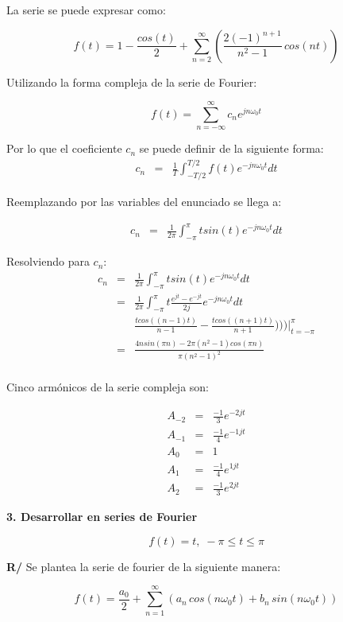 \documentclass[twocolumn]{article}
\begin{document}
La serie se puede expresar como:

$$f(t) = 1 - \frac{cos(t)}{2} + \sum_{n=2}^\infty\left( \frac{2(-1)^{n+1}}{n^2 - 1} \,cos(n t) \right)$$

Utilizando la forma compleja de la serie de Fourier:


$$f(t) =  \sum_{n=-\infty}^\infty c_n e^{jn\omega_0t} $$


Por lo que el coeficiente $c_n$ se puede definir de la siguiente forma:
\begin{eqnarray*}
c_n &=& \frac{1}{T}\int_{-T/2}^{T/2}f(t)e^{-jn\omega_0t}dt
\end{eqnarray*}

Reemplazando por las variables del enunciado se llega a:

\begin{eqnarray*}
c_n &=& \frac{1}{2\pi}\int_{-\pi}^{\pi}tsin(t)e^{-jn\omega_0t}dt
\end{eqnarray*}

Resolviendo para $c_n$:
\begin{eqnarray*}
c
_n &=& \frac{1}{2\pi}\int_{-\pi}^{\pi}tsin(t)e^{-jn\omega_0t}dt\\
&=& \frac{1}{2\pi}\int_{-\pi}^{\pi}t \frac{e^{jt} -e^{-jt}}{2j} e^{-jn\omega_0t}dt\\
& & \frac{tcos((n-1)t)}{n-1} - \frac{tcos((n+1)t)}{n+1})\bigg)\bigg)\bigg|_{t=-\pi}^{\pi}\\
&=& \frac{4nsin(\pi n)-2\pi(n^{2}-1)cos(\pi n)}{\pi(n^{2}- 1)^{2}}\\
\end{eqnarray*}

Cinco armónicos de la serie compleja son:

\begin{eqnarray*}
A_{-2} &=& \frac{-1}{3} e^{-2 j t} \\
A_{-1} &=& \frac{-1}{4} e^{-1 j t} \\
A_0 &=& 1 \\
A_1 &=& \frac{-1}{4} e^{1 j t}\\
A_2 &=& \frac{-1}{3} e^{2 j t} 
\end{eqnarray*}


\textbf{3. Desarrollar en series de Fourier}

$$f(t) = t,\; -\pi \leq t \leq \pi$$

\textbf{R/} Se plantea la serie de fourier de la siguiente manera:

$$f(t) = \frac{a_0}{2} + \sum_{n=1}^\infty\left(a_n\,cos(n\omega_0t) + b_n\,sin(n\omega_0t)\right)$$
\end{document}
